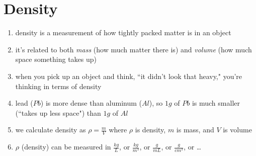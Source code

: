 \documentclass[11pt, oneside]{article}   	%
\begin{document}
\begin{enumerate}[label=Example \arabic*]
\end{enumerate}

\section{Density}
\begin{enumerate}
\item density is a measurement of how tightly packed matter is in an object
\item it's related to both \emph{mass} (how much matter there is) and \emph{volume} (how much space something takes up)
\item when you pick up an object and think, ``it didn't look that heavy," you're thinking in terms of density
\item lead ($Pb$) is more dense than aluminum ($Al$), so $1 g$ of $Pb$ is much smaller (``takes up less space") than $1 g$ of $Al$
\item we calculate density as $ \rho = \frac{m}{V} $ where $\rho$ is density, $m$ is mass, and $V$ is volume
\item $ \rho $ (density) can be measured in $\frac{kg}{L}$, or $\frac{kg}{m^{3}}$, or $\frac{g}{mL}$, or $\frac{g}{cm^{3}}$, or \ldots
\end{enumerate}


{}

\end{document}
